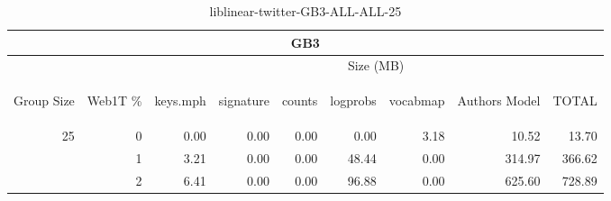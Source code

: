 \begin{center}
\begin{table}[htbp] 
 \begin{center}
\begin{tabular}{ | r | r | r | r | r | r | r | r | r |}
\hline
\multicolumn{9}{|c|}{GB3}\\
\hline
 & & \multicolumn{7}{|c|}{Size (MB)}\\ \cline{3-9}
\begin{sideways}Group Size\end{sideways} & \begin{sideways}Web1T \% \end{sideways} & \begin{sideways}keys.mph\end{sideways} & \begin{sideways}signature\end{sideways} & \begin{sideways}counts\end{sideways} & \begin{sideways}logprobs\end{sideways} & \begin{sideways}vocabmap\end{sideways} & \begin{sideways}Authors Model \end{sideways} & \begin{sideways}TOTAL\end{sideways}\\
\hline
\multirow{2}{*}{25}
 & 0 & 0.00 & 0.00 & 0.00 & 0.00 & 3.18 & 10.52 & 13.70\\ \cline{2-9}
 & 1 & 3.21 & 0.00 & 0.00 & 48.44 & 0.00 & 314.97 & 366.62\\ \cline{2-9}
 & 2 & 6.41 & 0.00 & 0.00 & 96.88 & 0.00 & 625.60 & 728.89\\ \cline{2-9}
\hline
\end{tabular}
\caption{liblinear-twitter-GB3-ALL-ALL-25}
\label{table:liblinear-twitter-GB3-ALL-ALL-25}
\end{center}
 \end{table}
\end{center}

